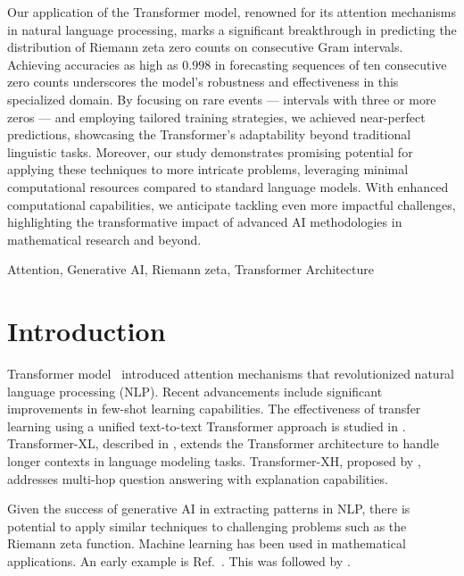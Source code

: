 \documentclass[journal]{IEEEtai}
\begin{document}
\begin{IEEEImpStatement}
Our application of the Transformer model, renowned for its attention mechanisms in natural language processing, marks a significant breakthrough in predicting the distribution of Riemann zeta zero counts on consecutive Gram intervals. Achieving accuracies as high as $0.998$ in forecasting sequences of ten consecutive zero counts underscores the model's robustness and effectiveness in this specialized domain. By focusing on rare events — intervals with three or more zeros — and employing tailored training strategies, we achieved near-perfect predictions, showcasing the Transformer's adaptability beyond traditional linguistic tasks. Moreover, our study demonstrates promising potential for applying these techniques to more intricate problems, leveraging minimal computational resources compared to standard language models. With enhanced computational capabilities, we anticipate tackling even more impactful challenges, highlighting the transformative impact of advanced AI methodologies in mathematical research and beyond.

\end{IEEEImpStatement}

\begin{IEEEkeywords}
Attention, Generative AI, Riemann zeta, Transformer Architecture
\end{IEEEkeywords}



\section{Introduction}

  Transformer model~\cite{vaswani2017attention} introduced attention mechanisms that revolutionized natural language processing (NLP).
Recent advancements \cite{radford2019language,brown2020language} include significant improvements in few-shot learning capabilities.
The effectiveness of transfer learning using a unified text-to-text Transformer approach is studied in \cite{raffel2019exploring}.
Transformer-XL, described in \cite{dai2019transformerxl}, extends the Transformer architecture to handle longer contexts in language modeling tasks.
Transformer-XH, proposed by \cite{zhang2019transformerxh}, addresses multi-hop question answering with explanation capabilities. 

Given the success of generative AI in extracting patterns in NLP, there is potential to apply similar techniques to challenging problems such as the Riemann zeta function.
Machine learning has been used in mathematical applications. An early example is  Ref.~\cite{osneural}. This was followed by \cite{he2022sato}.
\end{document}
